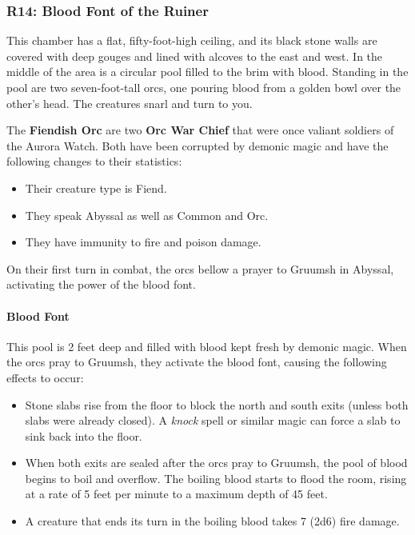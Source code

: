 \documentclass[10pt,a4,twoside,twocolumn,openany,nodeprecatedcode]{dndbook}
\begin{document}
\subsubsection{R14: Blood Font of the Ruiner}
\begin{DndReadAloud}{}
This chamber has a flat, fifty-foot-high ceiling, and its black stone walls are covered with deep gouges and lined with alcoves to the east and west. In the middle of the area is a circular pool filled to the brim with blood. Standing in the pool are two seven-foot-tall orcs, one pouring blood from a golden bowl over the other's head. The creatures snarl and turn to you.
\end{DndReadAloud}

The \textbf{Fiendish Orc} are two \textbf{Orc War Chief} that were once valiant soldiers of the Aurora Watch. Both have been corrupted by demonic magic and have the following changes to their statistics:
\begin{itemize}

\item Their creature type is Fiend.
\item They speak Abyssal as well as Common and Orc.
\item They have immunity to fire and poison damage.
\end{itemize}


On their first turn in combat, the orcs bellow a prayer to Gruumsh in Abyssal, activating the power of the blood font.
\paragraph{Blood Font}
This pool is 2 feet deep and filled with blood kept fresh by demonic magic. When the orcs pray to Gruumsh, they activate the blood font, causing the following effects to occur:
\begin{itemize}

\item Stone slabs rise from the floor to block the north and south exits (unless both slabs were already closed). A \textit{knock} spell or similar magic can force a slab to sink back into the floor.
\item When both exits are sealed after the orcs pray to Gruumsh, the pool of blood begins to boil and overflow. The boiling blood starts to flood the room, rising at a rate of 5 feet per minute to a maximum depth of 45 feet.
\item A creature that ends its turn in the boiling blood takes 7 (2d6) fire damage.
\end{itemize}
\end{document}
